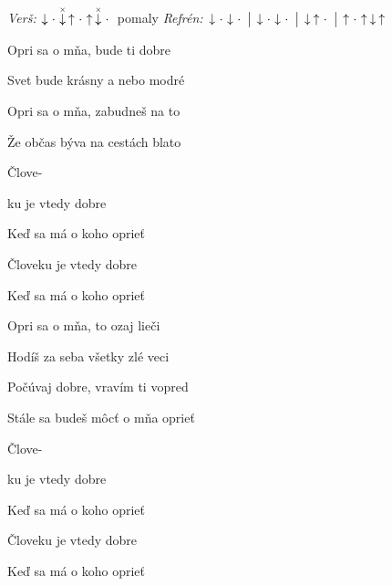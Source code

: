 \begin{song}


\begin{headerbox}
\RaiseBoxWithAccents
\textit{Verš:} $\Down\Miss\ChuckDown\Up\Miss\Up\ChuckDown\Miss$ pomaly \quad
\textit{Refrén:} $\Down\Miss\Down\Miss \Separator \Down\Miss\Down\Miss \Separator \Down\Up\Miss \Separator \Up\Miss\Up\Down\Up$
\end{headerbox}

\begin{hchordbox}
\end{hchordbox}

\Large

\bigskip

 Opri sa o mňa,  bude ti dobre \par
{} Svet bude krásny  a nebo modré \par
{} Opri sa o mňa,  zabudneš na to \par
{} Že občas býva na cestách blato \par

\bigskip

 Člove- \par
{}ku je vtedy dobre   \par
Keď sa má o koho oprieť  \par
Človeku je vtedy dobre   \par
Keď sa má o koho oprieť  \par

\bigskip

 Opri sa o mňa,  to ozaj lieči \par
{} Hodíš za seba všetky zlé veci \par
{} Počúvaj dobre,  vravím ti vopred \par
{} Stále sa budeš môcť o mňa oprieť \par

\bigskip

 Člove- \par
{}ku je vtedy dobre   \par
Keď sa má o koho oprieť  \par
Človeku je vtedy dobre   \par
Keď sa má o koho oprieť  \par


\end{song}
